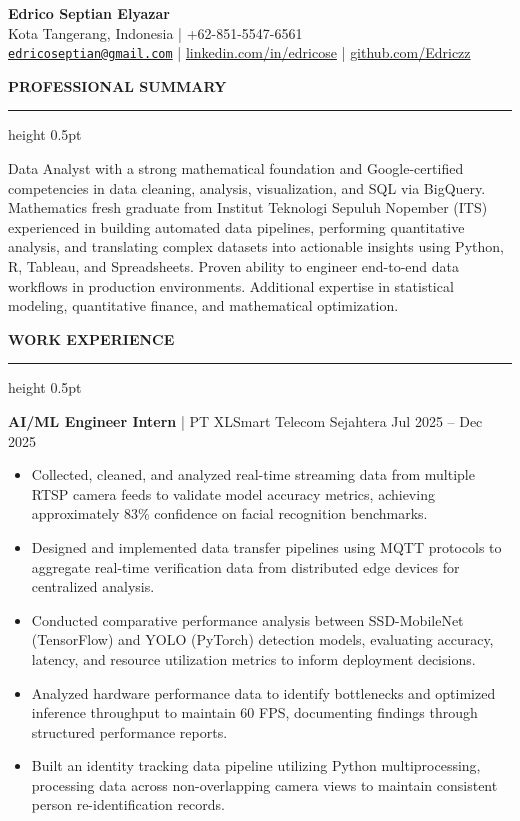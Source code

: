 \documentclass[11pt, letterpaper]{article}
\newcommand{\cvsection}[1]{%
    \vspace{0.8em}%
    {\large \textbf{\MakeUppercase{#1}}}%
    \vspace{0.2em}%
    \hrule height 0.5pt%
    \vspace{0.4em}%
}
\begin{document}
\begin{center}
    {\Huge \textbf{Edrico Septian Elyazar}} \\ \vspace{0.3em}
    Kota Tangerang, Indonesia | +62-851-5547-6561 \\ \vspace{0.3em}
    \href{mailto:edricoseptian@gmail.com}{\nolinkurl{edricoseptian@gmail.com}} |
    \href{https://linkedin.com/in/edricose}{linkedin.com/in/edricose} |
    \href{https://github.com/Edriczz}{github.com/Edriczz}
\end{center}

\cvsection{Professional Summary}
Data Analyst with a strong mathematical foundation and Google-certified competencies in data cleaning, analysis, visualization, and SQL via BigQuery. Mathematics fresh graduate from Institut Teknologi Sepuluh Nopember (ITS) experienced in building automated data pipelines, performing quantitative analysis, and translating complex datasets into actionable insights using Python, R, Tableau, and Spreadsheets. Proven ability to engineer end-to-end data workflows in production environments. Additional expertise in statistical modeling, quantitative finance, and mathematical optimization.

\cvsection{Work Experience}
\textbf{AI/ML Engineer Intern} | PT XLSmart Telecom Sejahtera \hfill Jul 2025 -- Dec 2025
\begin{itemize}[leftmargin=*, nosep]
    \item Collected, cleaned, and analyzed real-time streaming data from multiple RTSP camera feeds to validate model accuracy metrics, achieving approximately 83\% confidence on facial recognition benchmarks.
    \item Designed and implemented data transfer pipelines using MQTT protocols to aggregate real-time verification data from distributed edge devices for centralized analysis.
    \item Conducted comparative performance analysis between SSD-MobileNet (TensorFlow) and YOLO (PyTorch) detection models, evaluating accuracy, latency, and resource utilization metrics to inform deployment decisions.
    \item Analyzed hardware performance data to identify bottlenecks and optimized inference throughput to maintain 60 FPS, documenting findings through structured performance reports.
    \item Built an identity tracking data pipeline utilizing Python multiprocessing, processing data across non-overlapping camera views to maintain consistent person re-identification records.
\end{itemize}
\end{document}
